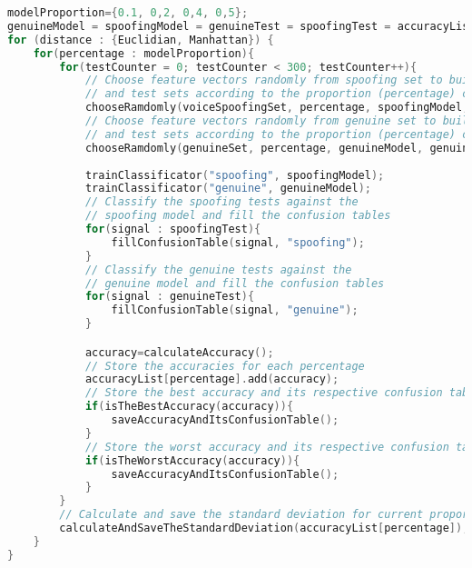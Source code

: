 \begin{lstlisting}[language=C++, caption={Procedure 02 algorithm}, label={lst:experiment02Algo}]
modelProportion={0.1, 0,2, 0,4, 0,5};
genuineModel = spoofingModel = genuineTest = spoofingTest = accuracyList = {};
for (distance : {Euclidian, Manhattan}) {
	for(percentage : modelProportion){
		for(testCounter = 0; testCounter < 300; testCounter++){
			// Choose feature vectors randomly from spoofing set to build the model
			// and test sets according to the proportion (percentage) chosen
			chooseRamdomly(voiceSpoofingSet, percentage, spoofingModel, spoofingTest);
			// Choose feature vectors randomly from genuine set to build the model
			// and test sets according to the proportion (percentage) chosen
			chooseRamdomly(genuineSet, percentage, genuineModel, genuineTest);
			
			trainClassificator("spoofing", spoofingModel);
			trainClassificator("genuine", genuineModel);
			// Classify the spoofing tests against the 
			// spoofing model and fill the confusion tables
			for(signal : spoofingTest){
				fillConfusionTable(signal, "spoofing");
			} 
			// Classify the genuine tests against the
			// genuine model and fill the confusion tables
			for(signal : genuineTest){
				fillConfusionTable(signal, "genuine");
			}

			accuracy=calculateAccuracy();
			// Store the accuracies for each percentage
			accuracyList[percentage].add(accuracy);
			// Store the best accuracy and its respective confusion table
			if(isTheBestAccuracy(accuracy)){
				saveAccuracyAndItsConfusionTable();
			}
			// Store the worst accuracy and its respective confusion table
			if(isTheWorstAccuracy(accuracy)){
				saveAccuracyAndItsConfusionTable();
			}
		}
		// Calculate and save the standard deviation for current proportion
		calculateAndSaveTheStandardDeviation(accuracyList[percentage]);
	}
}				
\end{lstlisting}